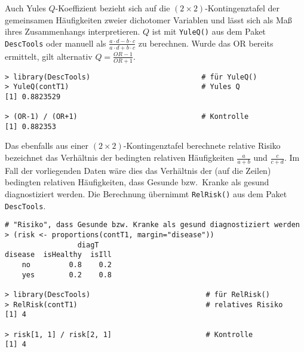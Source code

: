%
%

Auch Yules $Q$-Koeffizient bezieht sich auf die $(2 \times 2)$-Kontingenztafel der gemeinsamen Häufigkeiten zweier dichotomer Variablen und lässt sich als Maß ihres Zusammenhangs interpretieren. $Q$ ist mit \lstinline!YuleQ()! aus dem Paket \lstinline!DescTools! oder manuell als $\frac{a \cdot d - b \cdot c}{a \cdot d + b \cdot c}$ zu berechnen. Wurde das OR bereits ermittelt, gilt alternativ $Q = \frac{OR-1}{OR+1}$.
\begin{lstlisting}
> library(DescTools)                          # für YuleQ()
> YuleQ(contT1)                               # Yules Q
[1] 0.8823529

> (OR-1) / (OR+1)                             # Kontrolle
[1] 0.882353
\end{lstlisting}

Das ebenfalls aus einer $(2 \times 2)$-Kontingenztafel berechnete relative Risiko bezeichnet das Verhältnis der bedingten relativen Häufigkeiten $\frac{a}{a+b}$ und $\frac{c}{c+d}$. Im Fall der vorliegenden Daten wäre dies das Verhältnis der (auf die Zeilen) bedingten relativen Häufigkeiten, dass Gesunde bzw.\ Kranke als gesund diagnostiziert werden. Die Berechnung übernimmt  \lstinline!RelRisk()! aus dem Paket \lstinline!DescTools!.
\begin{lstlisting}
# "Risiko", dass Gesunde bzw. Kranke als gesund diagnostiziert werden
> (risk <- proportions(contT1, margin="disease"))
                 diagT
disease  isHealthy  isIll
    no         0.8    0.2
    yes        0.2    0.8

> library(DescTools)                           # für RelRisk()
> RelRisk(contT1)                              # relatives Risiko
[1] 4

> risk[1, 1] / risk[2, 1]                      # Kontrolle
[1] 4
\end{lstlisting}


